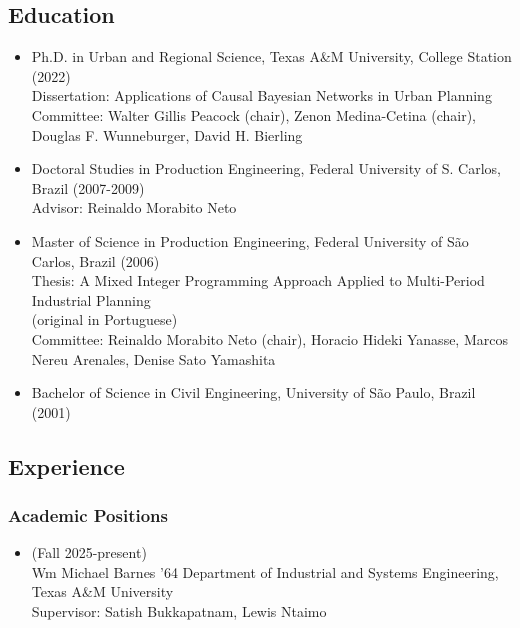 \documentclass[11pt,oneside]{article}
\begin{document}
\subsection{Education}
\begin{itemize}[leftmargin=40pt, label={-}]
\item {\frutigerregular Ph.D. in Urban and Regional Science}, Texas A\&M University, College Station (2022)\\
      Dissertation: Applications of Causal Bayesian Networks in Urban Planning\\
      Committee: Walter Gillis Peacock (chair), Zenon Medina-Cetina (chair), Douglas F. Wunneburger, David H. Bierling
\item {\frutigerregular Doctoral Studies in Production Engineering}, Federal University of S. Carlos, Brazil (2007-2009)\\
      Advisor: Reinaldo Morabito Neto
\item {\frutigerregular Master of Science in Production Engineering}, Federal University of São Carlos, Brazil (2006)\\
      Thesis: A Mixed Integer Programming Approach Applied to Multi-Period Industrial Planning\\[-2pt]
      {\small (original in Portuguese)}\\
      Committee: Reinaldo Morabito Neto (chair), Horacio Hideki Yanasse, Marcos Nereu Arenales, Denise Sato Yamashita
\item {\frutigerregular Bachelor of Science in Civil Engineering}, University of São Paulo, Brazil (2001)
\end{itemize}

\subsection{Experience}
\subsubsection{Academic Positions}
\begin{itemize}[leftmargin=40pt, label={-}]
\item {} (Fall 2025-present)\\
      {Wm Michael Barnes ’64 Department of Industrial and Systems Engineering, Texas A\&M University}\\
      Supervisor: Satish Bukkapatnam, Lewis Ntaimo
\end{itemize}
\end{document}
